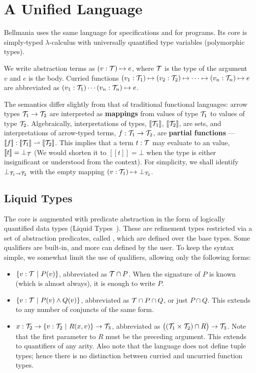 \section{A Unified Language}

\newcommand\semp[1]{[\![{#1}]\!]}
\newcommand\fix{\operatorname{fix}}

Bellmania uses the same language for specifications and for programs.  Its core is simply-typed
$\lambda$-calculus with universally quantified type variables (polymorphic types).

We write abstraction terms as $(v:\mathcal{T})\mapsto e$, where $\mathcal{T}$ is the type of the argument $v$ and $e$ is
the body. Curried functions $(v_1:\mathcal{T}_1)\mapsto (v_2:\mathcal{T}_2) \mapsto \cdots \mapsto (v_n:\mathcal{T}_n) \mapsto e$ are abbreviated 
as $(v_1:\mathcal{T}_1)\cdots(v_n:\mathcal{T}_n)\mapsto e$.

The semantics differ slightly from that of traditional functional languages: arrow types $\mathcal{T}_1\to\mathcal{T}_2$
are interpreted as {\bf mappings} from values of type $\mathcal{T}_1$ to values of type $\mathcal{T}_2$. Algebraically,
interpretations of types, $\semp{\T_1}$, $\semp{\T_2}$, are sets, and interpretations of arrow-typed terms,
$f : \mathcal{T}_1\to\mathcal{T}_2$, are {\bf partial functions} --- $\semp{f} : \semp{\T_1}\rightharpoonup\semp{\T_2}$.
This implies that a term $t : \mathcal{T}$ may evaluate to an  value, $\semp{t}=\bot_\T$
(We would shorten it to $\semp{t}=\bot$ when the type is either insignificant or understood from the context).
For simplicity, we shall identify $\bot_{\mathcal{T}_1\to\mathcal{T}_2}$ with the empty mapping $(v:\mathcal{T}_1)\mapsto\bot_{\mathcal{T}_2}$.

\subsection{Liquid Types}

The core is augmented with predicate abstraction in the form of logically quantified data types 
(Liquid Types~\cite{PLDI08/Rondon}). These are refinement types restricted via a set of abstraction predicates,
called , which are defined over the base types.
Some qualifiers are built-in, and more can defined by the user. To keep the syntax simple, we somewhat
limit the use of qualifiers, allowing only the following forms:

\begin{itemize}
  \item $\{v:\mathcal{T} ~|~ P(v)\}$, abbreviated as $\mathcal{T}\cap P$. When the signature of $P$ is known (which is
  almost always), it is enough to write $P$.
  \item $\{v:\mathcal{T} ~|~ P(v)\land Q(v)\}$, abbreviated as $\mathcal{T}\cap P\cap Q$, or just $P\cap Q$. This extends
  to any number of conjuncts of the same form.
  \item $x : \mathcal{T}_2 \to \{v:\mathcal{T}_2 ~|~ R(x,v)\} \to \mathcal{T}_3$, abbreviated as $\big((\mathcal{T}_1\times\mathcal{T}_2)\cap R\big)\to\mathcal{T}_3$.
  Note that the first parameter to $R$ must be the preceding argument. This extends to quantifiers of
  any arity. Also note that the language does not define tuple types; hence there is no distinction
  between curried and uncurried function types.
\end{itemize}

